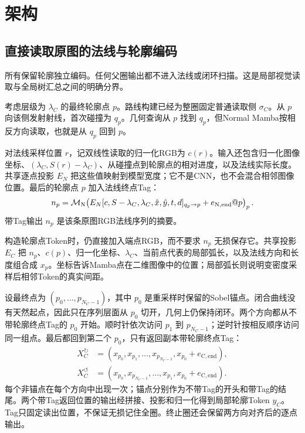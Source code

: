 \section{架构}
\label{sec:architecture}

\subsection{直接读取原图的法线与轮廓编码}

所有保留轮廓独立编码。任何父圈输出都不进入法线或闭环扫描。这是局部视觉读取与全局树汇总之间的明确分界。

考虑层级为 $\lambda_C$ 的最终轮廓点 $p$。路线构建已经为整圈固定普通读取侧 $\sigma_C$。从 $p$ 向该侧发射射线，首次碰撞为 $q_p$。几何查询从 $p$ 找到 $q_p$，但Normal Mamba按相反方向读取，也就是从 $q_p$ 回到 $p$。

对法线采样位置 $r$，记双线性读取的归一化RGB为 $c(r)$。输入还包含归一化图像坐标、$(\lambda_C,S(r)-\lambda_C)$、从碰撞点到轮廓点的相对进度，以及法线实际长度。共享逐点投影 $E_N$ 把这些值映射到模型宽度；它不是CNN，也不会混合相邻图像位置。最后的轮廓点 $p$ 加入法线终点Tag：
\begin{equation}
n_p=\mathcal{M}_{\mathrm{N}}\!\left(E_N[c,S-\lambda_C,\lambda_C,\hat x,\hat y,t,d]_{q_p\rightarrow p}
+e_{\mathrm{N,end}}@p\right)_p.
\label{eq:normal-zh}
\end{equation}
带Tag输出 $n_p$ 是该条原图RGB法线序列的摘要。

构造轮廓点Token时，仍直接加入端点RGB，而不要求 $n_p$ 无损保存它。共享投影 $E_C$ 把 $n_p$、$c(p)$、归一化坐标、$\lambda_C$、当前点代表的局部弧长，以及法线方向和长度组合成 $x_p$。坐标告诉Mamba点在二维图像中的位置；局部弧长则说明变密度采样后相邻Token的真实间距。

设最终点为 $(p_0,\ldots,p_{N_C-1})$，其中 $p_0$ 是重采样时保留的Sobel锚点。闭合曲线没有天然起点，因此只在序列层面从 $p_0$ 切开，几何上仍保持闭环。两个方向都从不带轮廓终点Tag的 $p_0$ 开始。顺时针依次访问 $p_1$ 到 $p_{N_C-1}$；逆时针按相反顺序访问同一组点。最后都回到第二个 $p_0$，只有返回副本带轮廓终点Tag：
\begin{align}
X_C^{\circlearrowright}&=(x_{p_0},x_{p_1},\ldots,x_{p_{N_C-1}},x_{p_0}+e_{\mathrm{C,end}}),\\
X_C^{\circlearrowleft}&=(x_{p_0},x_{p_{N_C-1}},\ldots,x_{p_1},x_{p_0}+e_{\mathrm{C,end}}).
\end{align}
每个非锚点在每个方向中出现一次；锚点分别作为不带Tag的开头和带Tag的结尾。两个带Tag返回位置的输出经拼接、投影和归一化得到局部轮廓Token $y_C$。Tag只固定读出位置，不保证无损记住全圈。终止圈还会保留两方向对齐后的逐点输出。

